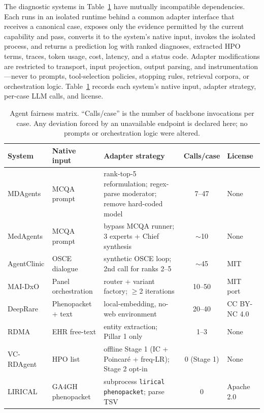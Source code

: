 \documentclass[letterpaper]{article} %
\begin{document}
The diagnostic systems in Table~\ref{tab:fairness} have mutually incompatible
dependencies. Each runs
in an isolated runtime behind a common adapter interface that receives a
canonical case, exposes only the evidence permitted by the current capability
and pass, converts it to the system's native input, invokes the isolated
process, and returns a prediction log with ranked diagnoses, extracted HPO
terms, traces, token usage, cost, latency, and a status code. Adapter
modifications are restricted to transport, input projection, output parsing, and
instrumentation---never to prompts, tool-selection policies, stopping rules,
retrieval corpora, or orchestration logic. Table~\ref{tab:fairness} records each
system's native input, adapter strategy, per-case LLM calls, and license.

\begin{table}[t]
\centering
\scriptsize
\setlength{\tabcolsep}{4pt}
\caption{Agent fairness matrix. ``Calls/case'' is the number of backbone
invocations per case. Any deviation forced by an unavailable endpoint is
declared here; no prompts or orchestration logic were altered.}
\label{tab:fairness}
\begin{tabular}{@{}lllcl@{}}
\toprule
System & Native input & Adapter strategy & Calls/case & License \\
\midrule
MDAgents & MCQA prompt & rank-top-5 reformulation; regex-parse moderator; remove hard-coded model & 7--47 & None \\
MedAgents & MCQA prompt & bypass MCQA runner; 3 experts + Chief synthesis & $\sim$10 & None \\
AgentClinic & OSCE dialogue & synthetic OSCE loop; 2nd call for ranks 2--5 & $\sim$45 & MIT \\
MAI-DxO & Panel orchestration & router + variant factory; $\geq$2 iterations & 10--50 & MIT port \\
DeepRare & Phenopacket + text & local-embedding, no-web environment & 20--40 & CC BY-NC 4.0 \\
RDMA & EHR free-text & entity extraction; Pillar 1 only & 1--3 & None \\
VC-RDAgent & HPO list & offline Stage 1 (IC + Poincar\'e + freq-LR); Stage 2 opt-in & 0 (Stage 1) & None \\
LIRICAL & GA4GH phenopacket & subprocess \texttt{lirical phenopacket}; parse TSV & 0 & Apache 2.0 \\
\bottomrule
\end{tabular}
\end{table}
\end{document}
